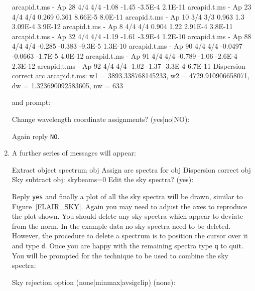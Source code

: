 \documentclass[twoside,11pt]{starlink}
\begin{document}
\begin{enumerate}
\begin{footnotesize}
  \begin{terminalv}
arcapid.t.ms - Ap 28    4/4     4/4       -1.08       -1.45  -3.5E-4 2.1E-11
arcapid.t.ms - Ap 23    4/4     4/4       0.269       0.361  8.66E-5 8.0E-11
arcapid.t.ms - Ap 10    3/4     3/3       0.963         1.3  3.09E-4 3.9E-12
arcapid.t.ms - Ap 8     4/4     4/4       0.904        1.22  2.91E-4 3.8E-11
arcapid.t.ms - Ap 32    4/4     4/4       -1.19       -1.61  -3.9E-4 1.2E-10
arcapid.t.ms - Ap 88    4/4     4/4      -0.285      -0.383  -9.3E-5 1.3E-10
arcapid.t.ms - Ap 90    4/4     4/4     -0.0497     -0.0663  -1.7E-5 4.0E-12
arcapid.t.ms - Ap 91    4/4     4/4      -0.789       -1.06  -2.6E-4 2.3E-12
arcapid.t.ms - Ap 92    4/4     4/4       -1.02       -1.37  -3.3E-4 6.7E-11
Dispersion correct arc arcapid.t.ms: w1 = 3893.338768145233, w2 = 4729.910906658071, dw =
1.323690092583605, nw = 633
\end{terminalv}
\end{footnotesize}

   and prompt:

\begin{terminalv}
Change wavelength coordinate assignments? (yes|no|NO):
\end{terminalv}

   Again reply \texttt{NO}.

  \item A further series of messages will appear:

\begin{terminalv}
Extract object spectrum obj
Assign arc spectra for obj
Dispersion correct obj
Sky subtract obj:  skybeams=0
Edit the sky spectra? (yes):
\end{terminalv}

   Reply \texttt{yes} and finally a plot of all the sky spectra will be
   drawn, similar to Figure~\ref{FLAIR_SKY}.  Again you may need to adjust
   the axes to reproduce the plot shown.  You should delete any sky spectra
   which appear to deviate from the norm.  In the example data no sky spectra
   need to be deleted.  However, the procedure to delete a spectrum is to
   position the cursor over it and type \texttt{d}.  Once you are happy with
   the remaining spectra type \texttt{q} to quit.  You will be prompted for the
   technique to be used to combine the sky spectra:

\begin{terminalv}
Sky rejection option (none|minmax|avsigclip) (none):
\end{terminalv}


\end{enumerate}
\end{document}
